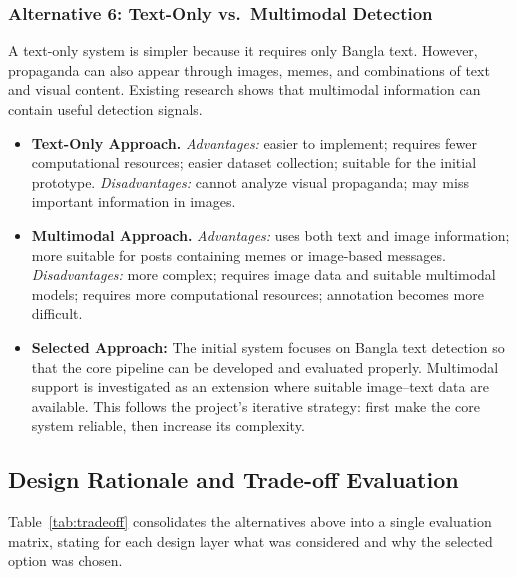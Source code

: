 \documentclass[12pt,a4paper]{report}
\begin{document}
\subsubsection{Alternative 6: Text-Only vs.\ Multimodal Detection}
A text-only system is simpler because it requires only Bangla text. However,
propaganda can also appear through images, memes, and combinations of text and
visual content. Existing research shows that multimodal information can contain
useful detection signals.
\begin{itemize}
  \item \textbf{Text-Only Approach.} \emph{Advantages:} easier to implement;
        requires fewer computational resources; easier dataset collection;
        suitable for the initial prototype. \emph{Disadvantages:} cannot analyze
        visual propaganda; may miss important information in images.
  \item \textbf{Multimodal Approach.} \emph{Advantages:} uses both text and image
        information; more suitable for posts containing memes or image-based
        messages. \emph{Disadvantages:} more complex; requires image data and
        suitable multimodal models; requires more computational resources;
        annotation becomes more difficult.
  \item \textbf{Selected Approach:} The initial system focuses on Bangla text
        detection so that the core pipeline can be developed and evaluated
        properly. Multimodal support is investigated as an extension where
        suitable image--text data are available. This follows the project's
        iterative strategy: first make the core system reliable, then increase its
        complexity.
\end{itemize}

\subsection{Design Rationale and Trade-off Evaluation}
Table~\ref{tab:tradeoff} consolidates the alternatives above into a single
evaluation matrix, stating for each design layer what was considered and why the
selected option was chosen.
\end{document}
